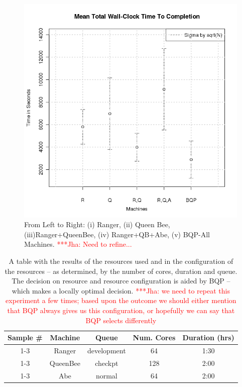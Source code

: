 \documentclass[conference,final]{IEEEtran}
\newcommand{\jhanote}[1]{ {\textcolor{red} { ***Jha: #1 }}}
\begin{document}
\begin{figure}
\begin{center}
\includegraphics[scale=0.34]{./figures/ErrorBarPlot.png}
\end{center}
\caption{From Left to Right: (i) Ranger, (ii) Queen Bee,
  (iii)Ranger+QueenBee, (iv) Ranger+QB+Abe, (v) BQP-All
  Machines. \jhanote{ Need to refine...}}
\label{fig:application_architecture}
\end{figure}

\begin{table}
\begin{tabular}{|c|c|c|c|c|}
\hline Sample \# & Machine & Queue & Num. Cores & Duration (hrs) \\ 
\hline 1-3 & Ranger & development & 64 & 1:30 \\ 
\hline 1-3 & QueenBee & checkpt & 128 & 2:00 \\ 
\hline 1-3 & Abe & normal & 64 & 2:00 \\ 
\hline 
\end{tabular} 
\caption{A table with the results of the resources used and in
  the configuration of the resources -- as determined, by the
  number of cores, duration and queue. The decision on
  resource and resource configuration is aided by BQP -- which 
  makes a locally optimal decision. \jhanote{we need to repeat
    this experiment a few times; based upon the outcome we should either
    mention that BQP always gives us this configuration, or hopefully we
    can say that BQP selects differently}}
\end{table}
\end{document}
